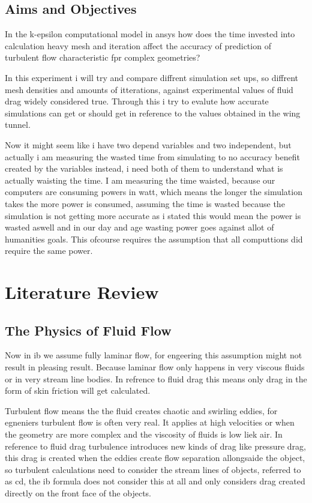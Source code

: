 \documentclass[12pt,a4paper]{article}
\begin{document}
\subsection{Aims and Objectives}

In the k-epsilon computational model in ansys how does the time invested into calculation heavy mesh and iteration affect the accuracy of prediction of turbulent flow characteristic fpr complex geometries?

In this experiment i will try and compare diffrent simulation set ups, so diffrent mesh densities and amounts of itterations, against experimental values of fluid drag widely considered true. Through this i try to evalute how accurate simulations can get or should get in reference to the values obtained in the wing tunnel.

Now it might seem like i have two depend variables and two independent, but actually i am measuring the wasted time from simulating to no accuracy benefit created by the variables instead, i need both of them to understand what is actually waisting the time. I am measuring the time waisted, because our computers are consuming powers in watt, which means the longer the simulation takes the more power is consumed, assuming the time is wasted because the simulation is not getting more accurate as i stated this would mean the power is wasted aswell and in our day and age wasting power goes against allot of humanities goals. This ofcourse requires the assumption that all computtions did require the same power.

\section{Literature Review}

\subsection{The Physics of Fluid Flow}

Now in ib we assume fully laminar flow, for engeering this assumption might not result in pleasing result. Because laminar flow only happens in very viscous fluids or in very stream line bodies. In refrence to fluid drag this means only drag in the form of skin friction will get calculated.

Turbulent flow means the the fluid creates chaotic and swirling eddies, for egneniers turbulent flow is often very real. It applies at high velocities or when the geometry are more complex and the viscosity of fluids is low liek air. In reference to fluid drag turbulence introduces new kinds of drag like pressure drag, this drag is created when the eddies create flow separation allongsaide the object, so turbulent calculations need to consider the stream lines of objects, referred to as cd, the ib formula does not consider this at all and only considers drag created directly on the front face of the objects. 
\end{document}

